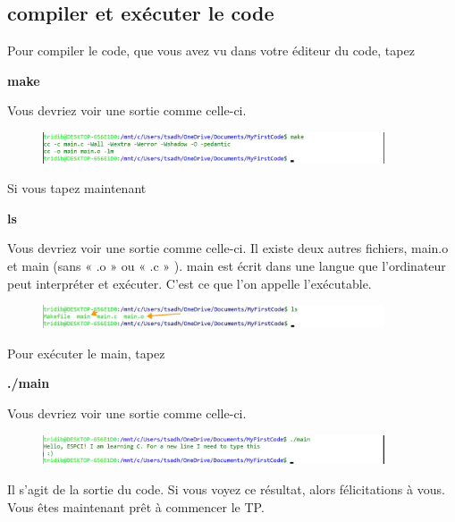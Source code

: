 \documentclass{article}
\begin{document}
\subsection{compiler et exécuter le code}
Pour compiler le code, que vous avez vu dans votre éditeur du code, tapez
\begin{tcolorbox}[width=\textwidth,colframe=BurntOrange,colback={black},title={ubuntu terminal},outer arc=0mm,colupper=white]   
      \large\textbf{  make }
\end{tcolorbox}

Vous devriez voir une sortie comme celle-ci.
\begin{figure}[H]
\center
\includegraphics[width=0.9\textwidth]{Plots/FirstCode_6.jpeg}
\end{figure}
Si vous tapez maintenant 
\begin{tcolorbox}[width=\textwidth,colframe=BurntOrange,colback={black},title={ubuntu terminal},outer arc=0mm,colupper=white] 
      \large\textbf{  ls }
\end{tcolorbox}
Vous devriez voir une sortie comme celle-ci. Il existe deux autres fichiers, main.o et main (sans « .o » ou « .c » ). main est écrit dans une langue que l'ordinateur peut interpréter et exécuter. C'est ce que l'on appelle l'exécutable.
 \begin{figure}[H]
\center
\includegraphics[width=0.9\textwidth]{Plots/FirstCode_7.jpeg}
\end{figure}
Pour exécuter le main, tapez
\begin{tcolorbox}[width=\textwidth,colframe=BurntOrange,colback={black},title={ubuntu terminal},outer arc=0mm,colupper=white]  
      \large\textbf{  ./main }
\end{tcolorbox}
Vous devriez voir une sortie comme celle-ci. 
\begin{figure}[H]
\center
\includegraphics[width=0.9\textwidth]{Plots/FirstCode_8.jpeg}
\end{figure}
Il s'agit de la sortie du code. Si vous voyez ce résultat, alors félicitations à vous. Vous êtes maintenant prêt à commencer le TP.
\end{document}
